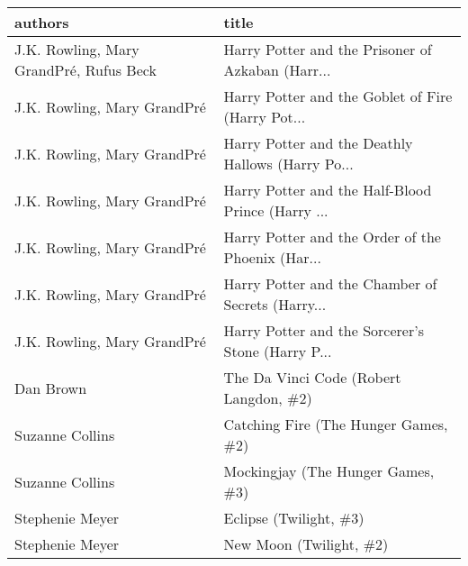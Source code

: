 \begin{tabular}{ll}
\toprule
                                 authors &                                              title \\
\midrule
 J.K. Rowling, Mary GrandPré, Rufus Beck &  Harry Potter and the Prisoner of Azkaban (Harr... \\
             J.K. Rowling, Mary GrandPré &  Harry Potter and the Goblet of Fire (Harry Pot... \\
             J.K. Rowling, Mary GrandPré &  Harry Potter and the Deathly Hallows (Harry Po... \\
             J.K. Rowling, Mary GrandPré &  Harry Potter and the Half-Blood Prince (Harry ... \\
             J.K. Rowling, Mary GrandPré &  Harry Potter and the Order of the Phoenix (Har... \\
             J.K. Rowling, Mary GrandPré &  Harry Potter and the Chamber of Secrets (Harry... \\
             J.K. Rowling, Mary GrandPré &  Harry Potter and the Sorcerer's Stone (Harry P... \\
                               Dan Brown &             The Da Vinci Code (Robert Langdon, \#2) \\
                         Suzanne Collins &               Catching Fire (The Hunger Games, \#2) \\
                         Suzanne Collins &                  Mockingjay (The Hunger Games, \#3) \\
                         Stephenie Meyer &                             Eclipse (Twilight, \#3) \\
                         Stephenie Meyer &                            New Moon (Twilight, \#2) \\
\bottomrule
\end{tabular}
